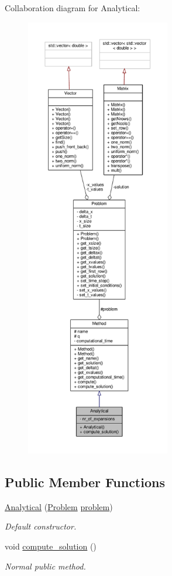 Collaboration diagram for Analytical\+:
\nopagebreak
\begin{figure}[H]
\begin{center}
\leavevmode
\includegraphics[height=550pt]{classAnalytical__coll__graph}
\end{center}
\end{figure}
\subsection*{Public Member Functions}
\begin{DoxyCompactItemize}
\item 
\hyperlink{classAnalytical_a04b2afb565db2e19293799c169e42adb}{Analytical} (\hyperlink{classProblem}{Problem} \hyperlink{classMethod_a29a08a679b5d30a8c813766308205041}{problem})
\begin{DoxyCompactList}\small\item\em Default constructor. \end{DoxyCompactList}\item 
void \hyperlink{classAnalytical_a48b4e86fd33f1dfd9f59b470cc1272a6}{compute\+\_\+solution} ()
\begin{DoxyCompactList}\small\item\em Normal public method. \end{DoxyCompactList}\end{DoxyCompactItemize}
